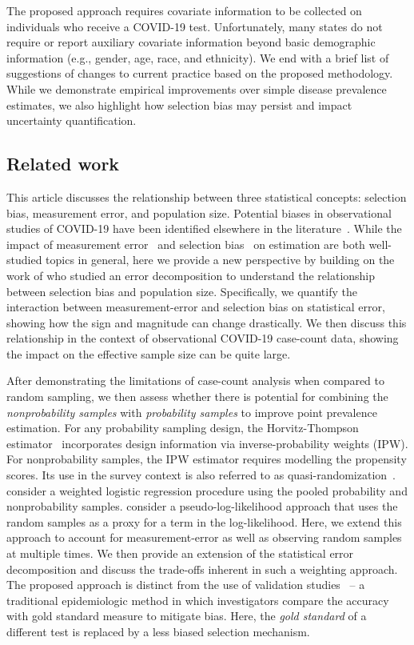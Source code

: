 \documentclass[11pt]{amsart}
\numberwithin{equation}{section}
\theoremstyle{plain}
\begin{document}
The proposed approach requires covariate information to be collected on individuals who receive a COVID-19 test.  Unfortunately, many states do not require or report auxiliary covariate information beyond basic demographic information (e.g., gender, age, race, and ethnicity).  We end with a brief list of suggestions of changes to current practice based on the proposed methodology. While we demonstrate empirical improvements over simple disease prevalence estimates, we also highlight how selection bias may persist and impact uncertainty quantification.

\subsection{Related work}

This article discusses the relationship between three statistical concepts: selection bias, measurement error, and population size.  Potential biases in observational studies of COVID-19 have been identified elsewhere in the literature~\citep{Kahn2021,Accorsi2020}.  While the impact of measurement error~\citep{Smeden2019} and selection bias~\citep{Keiding2016} on estimation are both well-studied topics in general, here we provide a new perspective by building on the work of \cite{Meng2018} who studied an error decomposition to understand the relationship between selection bias and population size.  Specifically, we quantify the interaction between measurement-error and selection bias on statistical error, showing how the sign and magnitude can change drastically.  We then discuss this relationship in the context of observational COVID-19 case-count data, showing the impact on the effective sample size can be quite large.

After demonstrating the limitations of case-count analysis when compared to random sampling, we then assess whether there is potential for combining the \emph{nonprobability samples} with \emph{probability samples} to improve point prevalence estimation. For any probability sampling design, the Horvitz-Thompson estimator~\citep{HT1952} incorporates design information via inverse-probability weights (IPW).  For nonprobability samples, the IPW estimator requires modelling the propensity scores.  Its use in the survey context is also referred to as quasi-randomization~\citep{Elliott2017}. \cite{Valliant2011} consider a weighted logistic regression procedure using the pooled probability and nonprobability samples.  \cite{Chen2019} consider a pseudo-log-likelihood approach that uses the random samples as a proxy for a term in the log-likelihood.  Here, we extend this approach to account for measurement-error as well as observing random samples at multiple times. We then provide an extension of the statistical error decomposition and discuss the trade-offs inherent in such a weighting approach. The proposed approach is distinct from the use of validation studies~\citep{Fox2020} -- a traditional epidemiologic method in which investigators compare the accuracy with gold standard measure to mitigate bias.  Here, the \emph{gold standard} of a different test is replaced by a less biased selection mechanism.
\end{document}

